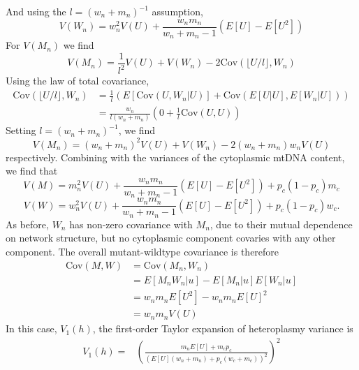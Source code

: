 \documentclass{article}
\begin{document}
\begin{appendices}
{And using the $l=(w_n+m_n)^{-1}$ assumption, 
\begin{equation}
    V(W_n) = w_n^2V(U)+\frac{w_nm_n}{w_n+m_n-1}(E[U]-E[U^2])
\end{equation}
For $V(M_n)$ we find
\begin{equation*}
    V(M_n)=\frac{1}{l^2}V(U)+V(W_n)-2\mathrm{Cov}(\lfloor U/l \rfloor,W_n)
\end{equation*}
Using the law of total covariance,
\begin{equation*}
\begin{split}
    \mathrm{Cov}(\lfloor U/l \rfloor,W_n)
    &=\frac{1}{l}\left(E[\mathrm{Cov}(U,W_n|U)]+\mathrm{Cov}(E[U|U],E[W_n|U])\right)\\
    &=\frac{w_n}{l(w_n+m_n)}\left(0+\frac{1}{l}\mathrm{Cov}(U,U)\right)
\end{split}
\end{equation*}
Setting $l=(w_n+m_n)^{-1}$, we find
\begin{equation}
    V(M_n) = (w_n+m_n)^2V(U)+V(W_n)-2(w_n+m_n)w_nV(U)
\end{equation}
respectively. Combining with the variances of the cytoplasmic mtDNA content, we find that
\begin{equation}\label{eq:app-vm-repel}
V(M) = m_n^2V(U)+\frac{w_nm_n}{w_n+m_n-1}(E[U]-E[U^2])+p_c(1-p_c)m_c
\end{equation}
\begin{equation}\label{eq:app-vw-repel}
V(W) = w_n^2V(U)+\frac{w_nm_n}{w_n+m_n-1}(E[U]-E[U^2])+p_c(1-p_c)w_c.
\end{equation}
As before, $W_n$ has non-zero covariance with $M_n$, due to their mutual dependence on network structure, but no cytoplasmic component covaries with any other component. The overall mutant-wildtype covariance is therefore
\begin{equation*}
\begin{split}
    \mathrm{Cov}(M,W) & =\mathrm{Cov}(M_n,W_n)\\
        & = E[M_nW_n|u]-E[M_n|u]E[W_n|u]\\
        & = w_nm_nE[U^2]-w_nm_nE[U]^2\\
        & = w_nm_nV(U)
    \end{split}
\end{equation*}
In this case, $V_1(h)$, the first-order Taylor expansion of heteroplasmy variance is
\begin{equation}
    \begin{split}
      V_1(h)= &\left(\frac{m_nE[U]+m_cp_c}{(E[U](w_n+m_n)+p_c(w_c+m_c))^2}\right)^2

\end{split}
\end{equation}}
\end{appendices}
\end{document}
